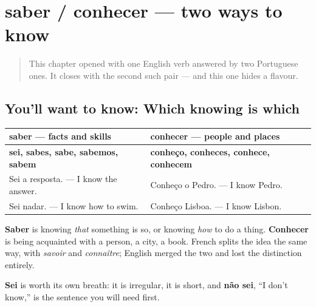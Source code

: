 \section[saber / conhecer]{saber / conhecer — two ways to know}

\label{lesson:PT-C18-saber-conhecer}



\begin{quote}
This chapter opened with one English verb answered by two Portuguese ones. It closes with the second such pair — and this one hides a flavour.
\end{quote}

\subsection*{You'll want to know: Which knowing is which}
\noindent
\begin{tabularx}{\linewidth}{@{}>{\raggedright\arraybackslash}X>{\raggedright\arraybackslash}X@{}}
\toprule
\textbf{saber — facts and skills} & \textbf{conhecer — people and places} \\
\midrule
\textbf{sei, sabes, sabe, sabemos, sabem} & \textbf{conheço, conheces, conhece, conhecem} \\
Sei a resposta. — I know the answer. & Conheço o Pedro. — I know Pedro. \\
Sei nadar. — I know how to swim. & Conheço Lisboa. — I know Lisbon. \\
\bottomrule
\end{tabularx}

\textbf{Saber} is knowing \emph{that} something is so, or knowing \emph{how} to do a thing. \textbf{Conhecer} is being acquainted with a person, a city, a book. French splits the idea the same way, with \emph{savoir} and \emph{connaître}; English merged the two and lost the distinction entirely.

\textbf{Sei} is worth its own breath: it is irregular, it is short, and \textbf{não sei}, \textquotedblleft{}I don't know,\textquotedblright{} is the sentence you will need first.

